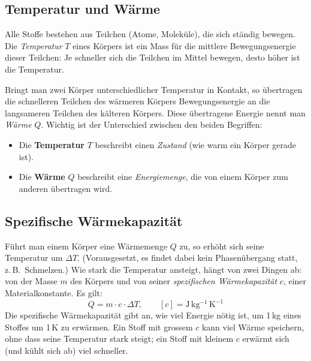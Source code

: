 \documentclass[11pt,a4paper]{article}
\newcommand{\Temp}{T}
\newcommand{\kelvin}{K}
\newcommand{\kilogram}{kg}
\newcommand{\SI}[2]{#1\,#2}
\begin{document}
\subsection{Temperatur und W\"arme}
Alle Stoffe bestehen aus Teilchen (Atome, Molek\"ule), die sich st\"andig bewegen. Die \emph{Temperatur} $\Temp$ eines K\"orpers ist ein Mass f\"ur die mittlere Bewegungsenergie dieser Teilchen: Je schneller sich die Teilchen im Mittel bewegen, desto h\"oher ist die Temperatur.

Bringt man zwei K\"orper unterschiedlicher Temperatur in Kontakt, so \"ubertragen die schnelleren Teilchen des w\"armeren K\"orpers Bewegungsenergie an die langsameren Teilchen des k\"alteren K\"orpers. Diese \"ubertragene Energie nennt man \emph{W\"arme} $Q$. Wichtig ist der Unterschied zwischen den beiden Begriffen:
\begin{itemize}
  \item Die \textbf{Temperatur} $\Temp$ beschreibt einen \emph{Zustand} (wie warm ein K\"orper gerade ist).
  \item Die \textbf{W\"arme} $Q$ beschreibt eine \emph{Energiemenge}, die von einem K\"orper zum anderen \"ubertragen wird.
\end{itemize}

\subsection{Spezifische W\"armekapazit\"at}
F\"uhrt man einem K\"orper eine W\"armemenge $Q$ zu, so erh\"oht sich seine Temperatur um $\Delta\Temp$. (Vorausgesetzt, es findet dabei kein Phasen\"ubergang statt, z.\,B.\ Schmelzen.) Wie stark die Temperatur ansteigt, h\"angt von zwei Dingen ab: von der Masse $m$ des K\"orpers und von seiner \emph{spezifischen W\"armekapazit\"at} $c$, einer Materialkonstante. Es gilt:
\[
  Q = m \cdot c \cdot \Delta\Temp, \qquad [c] = \mathrm{J\,kg^{-1}\,K^{-1}}
\]
Die spezifische W\"armekapazit\"at gibt an, wie viel Energie n\"otig ist, um \SI{1}{\kilogram} eines Stoffes um \SI{1}{\kelvin} zu erw\"armen. Ein Stoff mit grossem $c$ kann viel W\"arme speichern, ohne dass seine Temperatur stark steigt; ein Stoff mit kleinem $c$ erw\"armt sich (und k\"uhlt sich ab) viel schneller.
\end{document}
